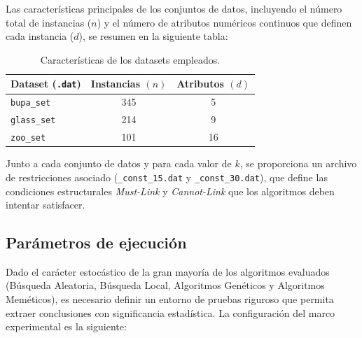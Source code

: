 \documentclass[a4paper,12pt]{article}%
\begin{document}
Las características principales de los conjuntos de datos, incluyendo el número total de instancias ($n$) y el número de atributos numéricos continuos que definen cada instancia ($d$), se resumen en la siguiente tabla:

\begin{table}[h!]
	\centering
	\begin{tabular}{|l|c|c|}
		\hline
		\textbf{Dataset} (\texttt{.dat}) & \textbf{Instancias $(n)$} & \textbf{Atributos $(d)$} \\ \hline
		\texttt{bupa\_set} & 345 & 5 \\ \hline
		\texttt{glass\_set} & 214 & 9 \\ \hline
		\texttt{zoo\_set} & 101 & 16 \\ \hline
	\end{tabular}
	\caption{Características de los datasets empleados.}
	\label{tab:datasets}
\end{table}

Junto a cada conjunto de datos y para cada valor de $k$, se proporciona un archivo de restricciones asociado (\texttt{\_const\_15.dat} y \texttt{\_const\_30.dat}), que define las condiciones estructurales \textit{Must-Link} y \textit{Cannot-Link} que los algoritmos deben intentar satisfacer.


\subsection{Parámetros de ejecución}

\noindent Dado el carácter estocástico de la gran mayoría de los algoritmos evaluados (Búsqueda Aleatoria, Búsqueda Local, Algoritmos Genéticos y Algoritmos Meméticos), es necesario definir un entorno de pruebas riguroso que permita extraer conclusiones con significancia estadística. La configuración del marco experimental es la siguiente:
\end{document}
